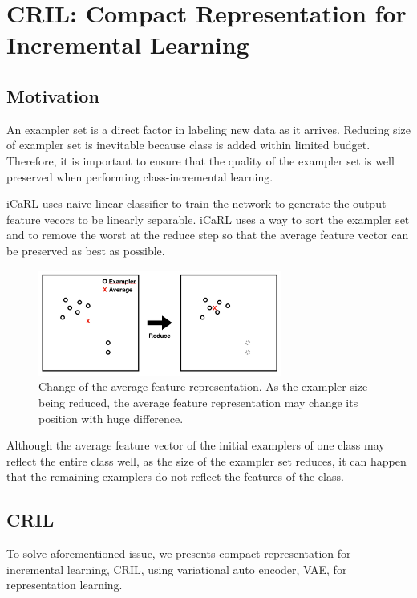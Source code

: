 
\section{CRIL: Compact Representation for Incremental Learning}
\label{sec:cril}

\subsection{Motivation}
\label{sec:motivation}

An exampler set is a direct factor in labeling new data as it arrives. Reducing size of exampler set is inevitable because class is added within limited budget. Therefore, it is important to ensure that the quality of the exampler set is well preserved when performing class-incremental learning.

iCaRL uses naive linear classifier to train the network to generate the output feature vecors to be linearly separable. iCaRL uses a way to sort the exampler set and to remove the worst at the reduce step so that the average feature vector can be preserved as best as possible.

\begin{figure}[h]
\includegraphics[width=80mm]{data/compact_motivation.png}
\centering
\caption{Change of the average feature representation. As the exampler size being reduced, the average feature representation may change its position with huge difference. \label{fig:compact_motivation}}
\end{figure}
Although the average feature vector of the initial examplers of one class may reflect the entire class well, as the size of the exampler set reduces, it can happen that the remaining examplers do not reflect the features of the class.

\subsection{CRIL}
To solve aforementioned issue, we presents compact representation for incremental learning, CRIL, using variational auto encoder, VAE, for representation learning. 

